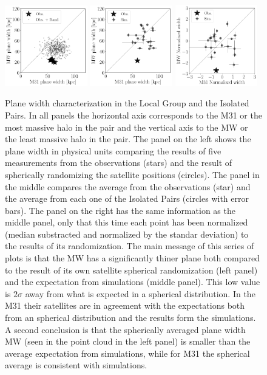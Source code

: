 \documentclass[a4paper,fleqn,usenatbib]{mnras}
\begin{document}
\begin{figure}
\centering
\includegraphics[width=0.32\textwidth]{scatter_random_ranked_width.pdf}
\includegraphics[width=0.32\textwidth]{scatter_ranked_width.pdf}
\includegraphics[width=0.32\textwidth]{scatter_norm_width.pdf}
\caption{Plane width characterization in the Local Group and the
  Isolated Pairs. In all panels the horizontal axis corresponds to the
  M31 or the most massive halo in the pair and the vertical axis to
  the MW or the least massive halo in the pair.
The panel on the left shows the plane width in physical units
comparing the results of five measurements from the observations
(stars) and the result of spherically randomizing the satellite
positions (circles). 
The panel in the middle compares the average from the observations
(star) and the average from each one of the Isolated Pairs (circles
with error bars).
The panel on the right has the same information as the middle panel,
only that this time each point has been normalized (median substracted
and normalized by the standar deviation) to the results of its
randomization. 
The main message of this series of plots is that the MW has a
significantly thiner plane both compared to the result of its own
satellite spherical randomization (left panel) and the expectation from
simulations (middle panel). 
This low value is $2\sigma$ away from what is expected in a spherical
distribution. 
In the M31 their satellites are in agreement with the expectations
both from an spherical distribution and the results form the
simulations. 
A second conclusion is that the spherically averaged plane width
MW (seen in the point cloud in the left panel) is smaller than the
average expectation from simulations, while for M31 the spherical
average is consistent with simulations. 
\label{fig:scatter_width}}
\end{figure}
\end{document}
